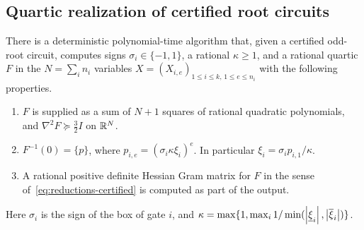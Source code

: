 \subsection{Quartic realization of certified root circuits}
\label{sec:reductions-realization}

\begin{theorem}
\label{thm:reductions-signed-root}
There is a deterministic polynomial-time algorithm that, given a certified
odd-root circuit, computes signs $\sigma_i\in\{-1,1\}$, a rational
$\kappa\ge1$, and a rational quartic $F$ in the $N=\sum_in_i$ variables
$X=(X_{i,e})_{1\le i\le k,\,1\le e\le n_i}$ with the following properties.
\begin{enumerate}[label=(\roman*)]
\item $F$ is supplied as a sum of $N+1$ squares of rational quadratic
polynomials, and $\nabla^2F\succeq\frac32I$ on $\mathbb R^N$.
\item $F^{-1}(0)=\{p\}$, where $p_{i,e}=(\sigma_i\kappa\xi_i)^e$. In
particular $\xi_i=\sigma_ip_{i,1}/\kappa$.
\item A rational positive definite Hessian Gram matrix for $F$ in the sense
of~\eqref{eq:reductions-certified} is computed as part of the output.
\end{enumerate}
Here $\sigma_i$ is the sign of the box of gate $i$, and
$\kappa=\max\{1,\max_i1/\min(\left\lvert\underline\xi_i\right\rvert,\left\lvert\overline\xi_i\right\rvert)\}$.
\end{theorem}

